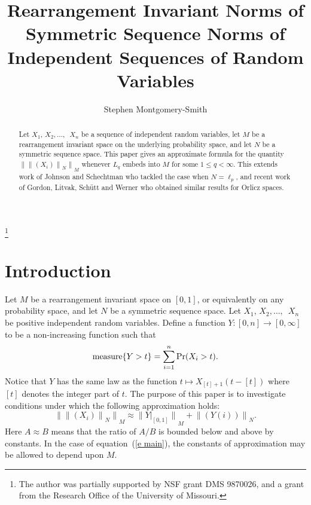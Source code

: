 \documentclass[12pt]{amsart}
\newcommand{\snormo}[1]{{\mathopen\|#1\mathclose\|}}
\newcommand{\measure}{\text{\rm measure}}
\begin{document}
\title[R.i. norms of symmetric sequence norms]
{Rearrangement Invariant Norms of Symmetric Sequence Norms
of Independent Sequences of Random Variables
}

\author{Stephen Montgomery-Smith}
\makeatletter
\address{Department of Mathematics\\
University of Missouri\\
Columbia, MO 65211}
\thanks{The author was 
partially supported
by NSF grant DMS 9870026, and a grant from the Research Office of the
University of Missouri.}

\begin{abstract}
\noindent
Let $X_1$, $X_2,\dots,$\ $X_n$ be a sequence of independent random
variables, let $M$ be a rearrangement invariant space on the underlying
probability space, and let $N$ be a symmetric sequence space.  This paper
gives an approximate formula for the quantity
$\snormo{\snormo{(X_i)}_N}_M$ whenever $L_q$ embeds into $M$ for some
$1 \le q < \infty$.
This extends work of Johnson and Schechtman who tackled the case when
$N = \ell_p$, and
recent work of Gordon, Litvak, Sch\"utt and Werner who obtained
similar results for Orlicz spaces.
\end{abstract}

\maketitle

\section{Introduction}

Let $M$ be a rearrangement invariant space on $[0,1]$, or equivalently
on any probability space, and let $N$ be a symmetric sequence space.
Let $X_1$, $X_2, \dots,$\ $X_n$ be positive independent random variables.
Define a function $Y:[0,n] \to [0,\infty]$ to be a non-increasing
function such that
\[ \measure\{Y > t \} = \sum_{i=1}^n \Pr(X_i > t) . \]
Notice that $Y$ has the same law as the function 
$t \mapsto X_{[t]+1}(t-[t])$ where $[t]$ denotes the integer part of $t$.
The purpose of this paper is to investigate conditions under which
the following approximation holds:
\begin{equation}
\label{e main}
   \snormo{\snormo{(X_i)}_N}_M \approx
   \snormo{Y|_{[0,1]}}_M + \snormo{(Y(i))}_N .
\end{equation}
Here $A \approx B$ means that the ratio of $A/B$ is bounded below
and above by constants.  In the case of equation~(\ref{e main}), the
constants of approximation may be allowed to depend upon $M$.
\end{document}
